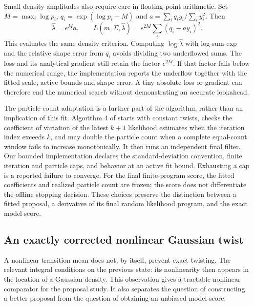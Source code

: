 \documentclass[11pt]{article}
\begin{document}
Small density amplitudes also require care in floating-point arithmetic.
Set $M=\max_i\log p_i$, $q_i=\exp(\log p_i-M)$ and
$a=\sum_i q_i y_i/\sum_i y_i^2$. Then
\[
 \widehat\lambda=e^M a,\qquad
 L(m,\Sigma,\widehat\lambda)
   =e^{2M}\sum_i(q_i-a y_i)^2.
\]
This evaluates the same density criterion. Computing $\log\widehat\lambda$
with log-sum-exp and the relative shape error from $q_i$ avoids dividing two
underflowed sums. The loss and its analytical gradient still retain the
factor $e^{2M}$. If that factor falls below the numerical range, the
implementation reports the underflow together with the fitted scale, active
bounds and shape error. A tiny absolute loss or gradient can therefore end
the numerical search without demonstrating an accurate lookahead.

The particle-count adaptation is a further part of the algorithm, rather
than an implication of this fit. Algorithm 4 of \citet{guarniero2017iapf}
starts with constant twists, checks the coefficient of variation of the
latest $k+1$ likelihood estimates when the iteration index exceeds $k$,
and may double the particle count when a complete equal-count window fails
to increase monotonically. It then runs an independent final filter. Our
bounded implementation declares the standard-deviation convention, finite
iteration and particle caps, and behavior at an active fit bound. Exhausting
a cap is a reported failure to converge. For the final finite-program score,
the fitted coefficients and realized particle count are frozen; the score
does not differentiate the offline stopping decision. These choices preserve
the distinction between a fitted proposal, a derivative of its final random
likelihood program, and the exact model score.

\subsection{An exactly corrected nonlinear Gaussian twist}
\label{sec:nonlinear-gaussian-twist}

A nonlinear transition mean does not, by itself, prevent exact twisting.
The relevant integral conditions on the previous state: its nonlinearity
then appears in the location of a Gaussian density. This observation gives
a tractable nonlinear comparator for the proposal study. It also separates
the question of constructing a better proposal from the question of obtaining
an unbiased model score.
\end{document}
